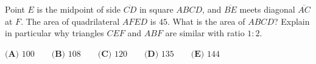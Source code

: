Point $E$ is the midpoint of side $\overline{CD}$ in square $ABCD$, and $\overline{BE}$ meets diagonal $\overline{AC}$ at $F$. The area of quadrilateral $AFED$ is $45$. What is the area of $ABCD$? Explain in particular why triangles $CEF$ and $ABF$ are similar with ratio $1:2$.

$\textbf{(A) }100\qquad\textbf{(B) }108\qquad\textbf{(C) }120\qquad\textbf{(D) }135\qquad\textbf{(E) }144$
